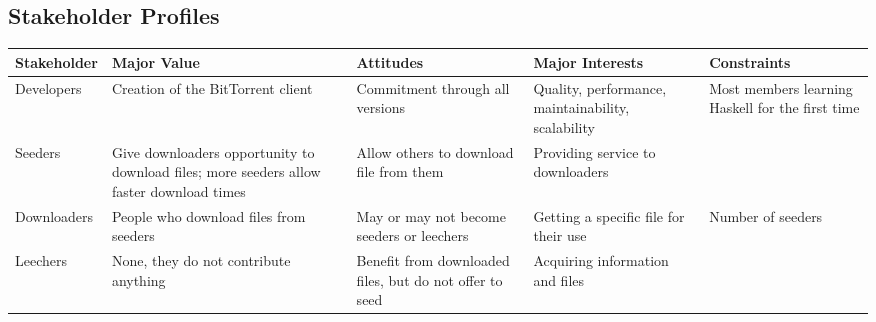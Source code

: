 \documentclass[letter]{scrartcl}
\begin{document}
\subsection{Stakeholder Profiles}
\tabcolsep=0.11cm
\begin{tabularx}{\textwidth}{| X | X | X | X | X |}
\hline
\textbf{Stakeholder} & \textbf{Major Value} & \textbf{Attitudes} & \textbf{Major Interests} & \textbf{Constraints} \\
\hline
\hline
Developers & Creation of the BitTorrent client & Commitment through all versions & Quality, performance, maintainability, scalability & Most members learning Haskell for the first time \\
\hline
Seeders & Give downloaders opportunity to download files; more seeders allow faster download times & Allow others to download file from them & Providing service to downloaders &  \\ 
\hline
Downloaders & People who download files from seeders & May or may not become seeders or leechers & Getting a specific file for their use & Number of seeders \\
\hline
Leechers& None, they do not contribute anything & Benefit from downloaded files, but do not offer to seed & Acquiring information and files & \\
\hline
\end{tabularx}
\end{document}
